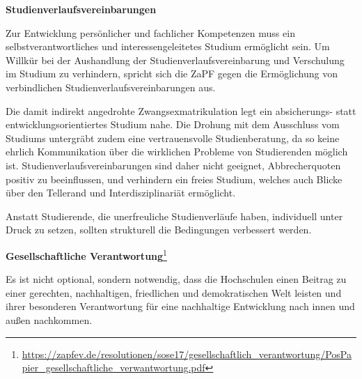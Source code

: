 \documentclass[DIV=calc]{scrartcl}
\begin{document}
\textbf{Studienverlaufsvereinbarungen}

Zur Entwicklung persönlicher und fachlicher Kompetenzen muss ein selbstverantwortliches und interessengeleitetes Studium ermöglicht sein. Um Willkür bei der Aushandlung der Studienverlaufsvereinbarung und Verschulung im Studium zu verhindern, spricht sich die ZaPF gegen die Ermöglichung von verbindlichen Studienverlaufsvereinbarungen aus. 

Die damit indirekt angedrohte Zwangsexmatrikulation legt ein absicherungs- statt entwicklungsorientiertes Studium nahe. Die Drohung mit dem Ausschluss vom Studiums untergräbt zudem eine vertrauensvolle Studienberatung, da so keine ehrlich Kommunikation über die wirklichen Probleme von Studierenden möglich ist. Studienverlaufsvereinbarungen sind daher nicht geeignet, Abbrecherquoten positiv zu beeinflussen, und verhindern ein freies Studium, welches auch Blicke über den Tellerand und Interdisziplinariät ermöglicht.

Anstatt Studierende, die unerfreuliche Studienverläufe haben, individuell unter Druck zu setzen, sollten strukturell die Bedingungen verbessert werden.

\textbf{Gesellschaftliche Verantwortung}\footnote{\url{https://zapfev.de/resolutionen/sose17/gesellschaftlich_verantwortung/PosPapier_gesellschaftliche_verwantwortung.pdf}}

Es ist nicht optional, sondern notwendig, dass die Hochschulen einen Beitrag zu einer gerechten, nachhaltigen, friedlichen und demokratischen Welt leisten und ihrer besonderen Verantwortung für eine nachhaltige Entwicklung nach innen und außen nachkommen.
\end{document}
